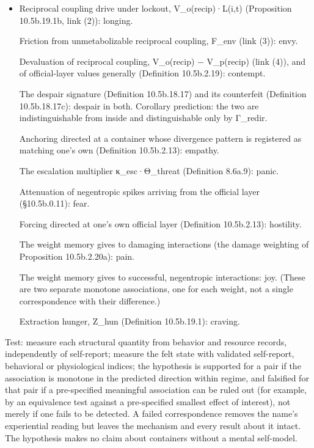 \documentclass[
]{article}
\providecommand{\tightlist}{%
  \setlength{\itemsep}{0pt}\setlength{\parskip}{0pt}}
\begin{document}
\begin{itemize}
\tightlist
\item
  Reciprocal coupling drive under lockout, V\_o(recip)·L(i,t)
  (Proposition 10.5b.19.1b, link (2)): longing.

  Friction from unmetabolizable reciprocal coupling, F\_env (link (3)):
  envy.

  Devaluation of reciprocal coupling, V\_o(recip) − V\_p(recip) (link
  (4)), and of official-layer values generally (Definition 10.5b.2.19):
  contempt.

  The despair signature (Definition 10.5b.18.17) and its counterfeit
  (Definition 10.5b.18.17c): despair in both. Corollary prediction: the
  two are indistinguishable from inside and distinguishable only by
  Γ\_redir.

  Anchoring directed at a container whose divergence pattern is
  registered as matching one's own (Definition 10.5b.2.13): empathy.

  The escalation multiplier κ\_esc·Θ\_threat (Definition 8.6a.9): panic.

  Attenuation of negentropic spikes arriving from the official layer
  (§10.5b.0.11): fear.

  Forcing directed at one's own official layer (Definition 10.5b.2.13):
  hostility.

  The weight memory gives to damaging interactions (the damage weighting
  of Proposition 10.5b.2.20a): pain.

  The weight memory gives to successful, negentropic interactions: joy.
  (These are two separate monotone associations, one for each weight,
  not a single correspondence with their difference.)

  Extraction hunger, Z\_hun (Definition 10.5b.19.1): craving.
\end{itemize}

Test: measure each structural quantity from behavior and resource
records, independently of self-report; measure the felt state with
validated self-report, behavioral or physiological indices; the
hypothesis is supported for a pair if the association is monotone in the
predicted direction within regime, and falsified for that pair if a
pre-specified meaningful association can be ruled out (for example, by
an equivalence test against a pre-specified smallest effect of
interest), not merely if one fails to be detected. A failed
correspondence removes the name's experiential reading but leaves the
mechanism and every result about it intact. The hypothesis makes no
claim about containers without a mental self-model.
\end{document}
